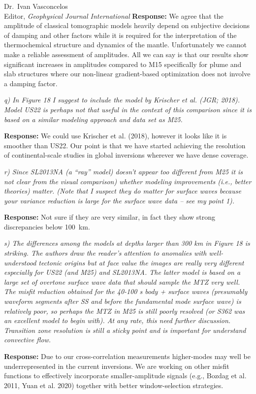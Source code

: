 \documentclass[11pt,a4paper]{letter}
\newcommand{\response}[1]{\textbf{Response:} #1}
\newcommand{\rev}[1]{{\it{#1}}}
\begin{document}
\begin{letter}{Dr.~Ivan Vasconcelos\\
Editor, \textit{Geophysical Journal International}}
\response{We agree that the amplitude of classical tomographic models heavily depend on subjective decisions of damping and other factors while it is required for the interpretation of the thermochemical structure and dynamics of the mantle. Unfortunately we cannot make a reliable assessment of amplitudes. All we can say is that our results show significant increases in amplitudes compared to M15 specifically for plume and slab structures where our non-linear gradient-based optimization does not involve a damping factor.}


\rev{q) In Figure 18 I suggest to include the model by Krischer et al. (JGR; 2018). Model US22 is perhaps not that useful in the context of this comparison since it is based on a similar modeling approach and data set as M25.}

\response{We could use Krischer et al. (2018), however it looks like it is smoother than US22. Our point is that we have started achieving the resolution of continental-scale studies in global inversions wherever we have dense coverage.}

\rev{r) Since SL2013NA (a ``ray'' model) doesn't appear too different from M25 it is not clear from the visual comparison) whether modeling improvements (i.e., better theories) matter.
(Note that I suspect they do matter for surface waves because your variance reduction is large for the surface wave data -- see my point 1).}

\response{Not sure if they are very similar, in fact they show strong discrepancies below 100~km. }

\rev{s) The differences among the models at depths larger than 300 km in Figure 18 is striking.
The authors draw the reader's attention to anomalies with well-understood tectonic origins but at face value the images are really very different especially for US22 (and M25) and SL2013NA.
The latter model is based on a large set of overtone surface wave data that should sample the MTZ very well. The misfit reduction obtained for the 40-100 s body + surface waves (presumably waveform segments after SS and before the fundamental mode surface wave) is relatively poor, so perhaps the MTZ in M25 is still poorly resolved (or S362 was an excellent model to begin with).
At any rate, this need further discussion. Transition zone resolution is still a sticky point and is important for understand convective flow.}

\response{Due to our cross-correlation measurements higher-modes may well be underrepresented in the current inversions. We are working on other misfit functions to effectively incorporate smaller-amplitude signals (e.g., Bozdag et al. 2011, Yuan et al. 2020) together with better window-selection strategies.}


\end{letter}
\end{document}
